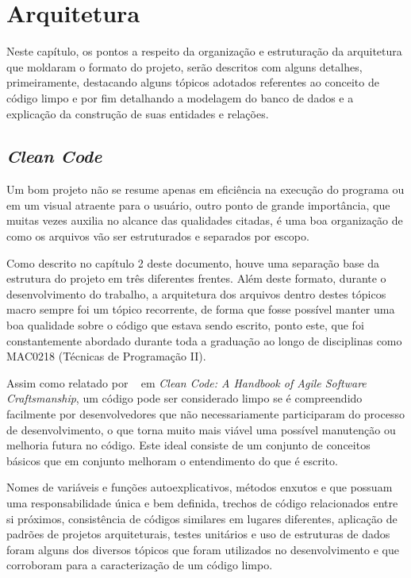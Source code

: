 
\chapter{Arquitetura}

Neste capítulo, os pontos a respeito da organização e estruturação da
arquitetura que moldaram o formato do projeto, serão descritos com alguns
detalhes, primeiramente, destacando alguns tópicos adotados referentes ao
conceito de código limpo e por fim detalhando a modelagem do banco de dados e a
explicação da construção de suas entidades e relações.

\section{\textit{Clean Code}}

Um bom projeto não se resume apenas em eficiência na execução do programa ou em
um visual atraente para o usuário, outro ponto de grande importância, que
muitas vezes auxilia no alcance das qualidades citadas, é uma boa organização
de como os arquivos vão ser estruturados e separados por escopo.

Como descrito no capítulo 2 deste documento, houve uma separação base da
estrutura do projeto em três diferentes frentes. Além deste formato, durante o
desenvolvimento do trabalho, a arquitetura dos arquivos dentro destes tópicos
macro sempre foi um tópico recorrente, de forma que fosse possível manter uma
boa qualidade sobre o código que estava sendo escrito, ponto este, que foi
constantemente abordado durante toda a graduação ao longo de disciplinas como
MAC0218 (Técnicas de Programação II).

Assim como relatado por ~\citet{cleanCode} em \textit{Clean Code: A Handbook of
    Agile Software Craftsmanship}, um código pode ser considerado limpo se é
compreendido facilmente por desenvolvedores que não necessariamente
participaram do processo de desenvolvimento, o que torna muito mais viável uma
possível manutenção ou melhoria futura no código. Este ideal consiste de um
conjunto de conceitos básicos que em conjunto melhoram o entendimento do que é
escrito.

Nomes de variáveis e funções autoexplicativos, métodos enxutos e que possuam
uma responsabilidade única e bem definida, trechos de código relacionados entre
si próximos, consistência de códigos similares em lugares diferentes, aplicação
de padrões de projetos arquiteturais, testes unitários e uso de estruturas de
dados foram alguns dos diversos tópicos que foram utilizados no desenvolvimento
e que corroboram para a caracterização de um código limpo.

